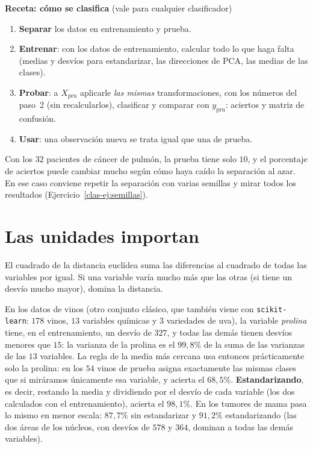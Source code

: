 \begin{mdframed}[linewidth=0.8pt,linecolor=gray]
\noindent\textbf{Receta: cómo se clasifica} (vale para cualquier clasificador)
\begin{enumerate}[leftmargin=*,itemsep=1pt]
\item \textbf{Separar} los datos en entrenamiento y prueba.
\item \textbf{Entrenar}: con los datos de entrenamiento, calcular todo lo que
haga falta (medias y desvíos para estandarizar, las direcciones de PCA, las
medias de las clases).
\item \textbf{Probar}: a $X_{\text{pru}}$ aplicarle \emph{las mismas}
transformaciones, con los números del paso~2 (sin recalcularlos), clasificar y
comparar con $y_{\text{pru}}$: aciertos y matriz de confusión.
\item \textbf{Usar}: una observación nueva se trata igual que una de prueba.
\end{enumerate}
\end{mdframed}

\begin{remark}\label{clas-rem:pocos}
Con los $32$ pacientes de cáncer de pulmón, la prueba tiene solo $10$, y el
porcentaje de aciertos puede cambiar mucho según cómo haya caído la separación
al azar. En ese caso conviene repetir la separación con varias semillas y
mirar todos los resultados (Ejercicio~\ref{clas-ej:semillas}).
\end{remark}

\section{Las unidades importan}\label{clas-sec:escalas}

El cuadrado de la distancia euclídea suma las diferencias al cuadrado de todas
las variables por igual. Si una variable varía mucho más que las otras (si
tiene un desvío mucho mayor), domina la distancia.

En los datos de vinos (otro conjunto clásico, que también viene con
\texttt{scikit-learn}: $178$ vinos, $13$ variables químicas y $3$ variedades
de uva), la variable \emph{prolina} tiene, en el entrenamiento, un desvío de
$327$, y todas las demás tienen desvíos menores que $15$: la varianza de la
prolina es el $99{,}8\%$ de la suma de las varianzas de las $13$ variables. La
regla de la media más cercana usa entonces prácticamente solo la prolina: en
los $54$ vinos de prueba asigna exactamente las mismas clases que si
miráramos únicamente esa variable, y acierta el $68{,}5\%$.
\textbf{Estandarizando}, es decir, restando la media y dividiendo por el
desvío de cada variable (los dos calculados con el entrenamiento), acierta el
$98{,}1\%$. En los tumores de mama pasa lo mismo en menor escala: $87{,}7\%$
sin estandarizar y $91{,}2\%$ estandarizando (las dos áreas de los núcleos,
con desvíos de $578$ y $364$, dominan a todas las demás variables).

